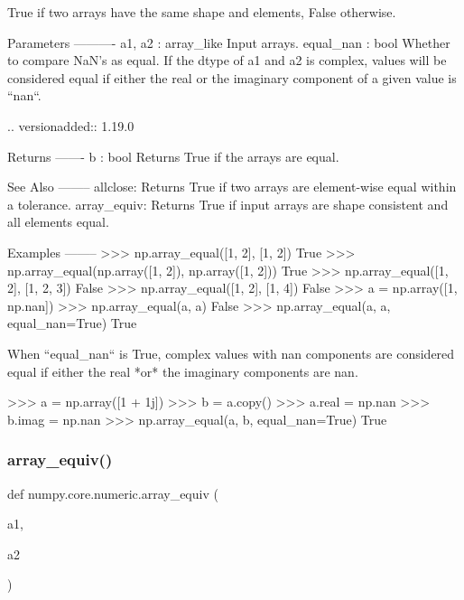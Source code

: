 \begin{DoxyVerb}True if two arrays have the same shape and elements, False otherwise.

Parameters
----------
a1, a2 : array_like
    Input arrays.
equal_nan : bool
    Whether to compare NaN's as equal. If the dtype of a1 and a2 is
    complex, values will be considered equal if either the real or the
    imaginary component of a given value is ``nan``.

    .. versionadded:: 1.19.0

Returns
-------
b : bool
    Returns True if the arrays are equal.

See Also
--------
allclose: Returns True if two arrays are element-wise equal within a
          tolerance.
array_equiv: Returns True if input arrays are shape consistent and all
             elements equal.

Examples
--------
>>> np.array_equal([1, 2], [1, 2])
True
>>> np.array_equal(np.array([1, 2]), np.array([1, 2]))
True
>>> np.array_equal([1, 2], [1, 2, 3])
False
>>> np.array_equal([1, 2], [1, 4])
False
>>> a = np.array([1, np.nan])
>>> np.array_equal(a, a)
False
>>> np.array_equal(a, a, equal_nan=True)
True

When ``equal_nan`` is True, complex values with nan components are
considered equal if either the real *or* the imaginary components are nan.

>>> a = np.array([1 + 1j])
>>> b = a.copy()
>>> a.real = np.nan
>>> b.imag = np.nan
>>> np.array_equal(a, b, equal_nan=True)
True
\end{DoxyVerb}
 \mbox{\label{namespacenumpy_1_1core_1_1numeric_a79b2410c270f1e92358efff765a130fb}} 
\subsubsection{\texorpdfstring{array\+\_\+equiv()}{array\_equiv()}}
{\footnotesize\ttfamily def numpy.\+core.\+numeric.\+array\+\_\+equiv (\begin{DoxyParamCaption}\item[{}]{a1,  }\item[{}]{a2 }\end{DoxyParamCaption})}

